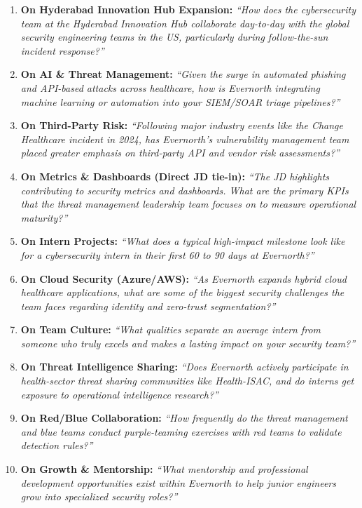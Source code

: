 \documentclass[10pt,a4paper]{article}
\begin{document}
\begin{enumerate}
    \item \textbf{On Hyderabad Innovation Hub Expansion:} \textit{``How does the cybersecurity team at the Hyderabad Innovation Hub collaborate day-to-day with the global security engineering teams in the US, particularly during follow-the-sun incident response?''}
    \item \textbf{On AI \& Threat Management:} \textit{``Given the surge in automated phishing and API-based attacks across healthcare, how is Evernorth integrating machine learning or automation into your SIEM/SOAR triage pipelines?''}
    \item \textbf{On Third-Party Risk:} \textit{``Following major industry events like the Change Healthcare incident in 2024, has Evernorth's vulnerability management team placed greater emphasis on third-party API and vendor risk assessments?''}
    \item \textbf{On Metrics \& Dashboards (Direct JD tie-in):} \textit{``The JD highlights contributing to security metrics and dashboards. What are the primary KPIs that the threat management leadership team focuses on to measure operational maturity?''}
    \item \textbf{On Intern Projects:} \textit{``What does a typical high-impact milestone look like for a cybersecurity intern in their first 60 to 90 days at Evernorth?''}
    \item \textbf{On Cloud Security (Azure/AWS):} \textit{``As Evernorth expands hybrid cloud healthcare applications, what are some of the biggest security challenges the team faces regarding identity and zero-trust segmentation?''}
    \item \textbf{On Team Culture:} \textit{``What qualities separate an average intern from someone who truly excels and makes a lasting impact on your security team?''}
    \item \textbf{On Threat Intelligence Sharing:} \textit{``Does Evernorth actively participate in health-sector threat sharing communities like Health-ISAC, and do interns get exposure to operational intelligence research?''}
    \item \textbf{On Red/Blue Collaboration:} \textit{``How frequently do the threat management and blue teams conduct purple-teaming exercises with red teams to validate detection rules?''}
    \item \textbf{On Growth \& Mentorship:} \textit{``What mentorship and professional development opportunities exist within Evernorth to help junior engineers grow into specialized security roles?''}
\end{enumerate}
\end{document}
